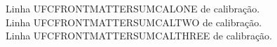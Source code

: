 \documentclass{abntexto-ufc}
\begin{document}
\pretextual


\thispagestyle{empty}
\begingroup
\onehalfsp
Linha UFCFRONTMATTERSUMCALONE de calibração.\\
Linha UFCFRONTMATTERSUMCALTWO de calibração.\\
Linha UFCFRONTMATTERSUMCALTHREE de calibração.
\par
\endgroup
\end{document}
